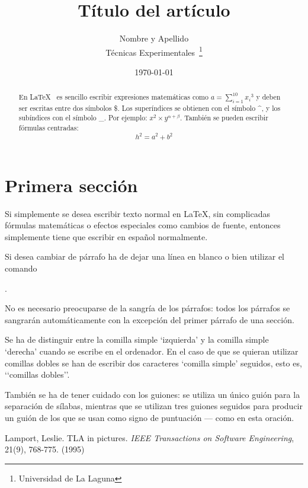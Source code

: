 \documentclass[a4paper,12pt]{article}
\begin{document}
\title{Título del artículo}
 \author{Nombre y Apellido \\
 Técnicas Experimentales~\footnote{Universidad de La Laguna}
 }
 \date{\today}
 \maketitle
 \begin{abstract}
 En \LaTeX{}~\cite{Lam:86} es sencillo escribir expresiones
 matemáticas como $a=\sum_{i=1}^{10} {x_i}^{3}$
 y deben ser escritas entre dos símbolos \$.
 Los superíndices se obtienen con el símbolo \^{}, y
 los subíndices con el símbolo \_.
 Por ejemplo: $x^2 \times y^{\alpha + \beta}$.
 También se pueden escribir fórmulas centradas:
 \[h^2=a^2 + b^2 \]
 \end{abstract}
 
\section{Primera sección}
 Si simplemente se desea escribir texto normal en LaTeX,
 sin complicadas f\'ormulas matem\'aticas o efectos especiales
 como cambios de fuente, entonces simplemente tiene que escribir
 en espa\~nol normalmente.\par
 Si desea cambiar de párrafo ha de dejar una línea en blanco o bien
 utilizar el comando \par.
 
 No es necesario preocuparse de la sangría de los párrafos:
 todos los párrafos se sangrarán automáticamente con la excepción
 del primer párrafo de una sección.
 
 Se ha de distinguir entre la comilla simple ‘izquierda’
 y la comilla simple ‘derecha’ cuando se escribe en el ordenador.
 En el caso de que se quieran utilizar comillas dobles se han de
 escribir dos caracteres ‘comilla simple’ seguidos, esto es,
 ‘‘co\-mi\-llas dobles’’.
 
 También se ha de tener cuidado con los guiones: se utiliza un único
 guión para la separación de sílabas, mientras que se utilizan
 tres guiones seguidos para producir un guión de los que se usan
 como signo de puntuación --- como en esta oración.
  \begin{thebibliography}{00}
 Lamport, Leslie.
 TLA in pictures.
 \emph{IEEE Transactions on Software Engineering},
 21(9), 768-775.
 (1995)
 \end{thebibliography}
 
\end{document}
